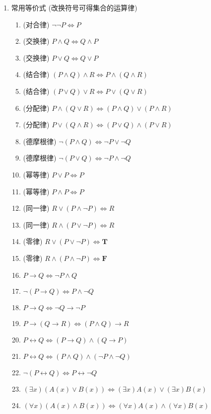 \begin{enumerate}
\item 常用等价式 (改换符号可得集合的运算律)
\begin{enumerate}[label={$E_{\arabic*}$}]
\item (对合律) $\neg\neg P \Leftrightarrow P$
\item (交换律) $P\wedge Q \Leftrightarrow Q\wedge P$
\item (交换律) $P\vee Q \Leftrightarrow Q\vee P$
\item (结合律) $(P\wedge Q)\wedge R \Leftrightarrow P\wedge(Q\wedge R)$
\item (结合律) $(P\vee Q)\vee R \Leftrightarrow P\vee(Q\vee R)$
\item (分配律) $P\wedge(Q\vee R) \Leftrightarrow (P\wedge Q)\vee(P\wedge R)$
\item (分配律) $P\vee(Q\wedge R) \Leftrightarrow (P\vee Q)\wedge(P\vee R)$
\item (德摩根律) $\neg(P\wedge Q) \Leftrightarrow \neg P\vee \neg Q$
\item (德摩根律) $\neg(P\vee Q) \Leftrightarrow \neg P\wedge \neg Q$
\item (幂等律) $P\vee P \Leftrightarrow P$
\item (幂等律) $P\wedge P \Leftrightarrow P$
\item (同一律) $R\vee(P\wedge \neg P) \Leftrightarrow R$
\item (同一律) $R\wedge(P\vee \neg P) \Leftrightarrow R$
\item (零律) $R\vee(P\vee \neg P) \Leftrightarrow \bm T$
\item (零律) $R\wedge(P\wedge \neg P) \Leftrightarrow \bm F$
\item $P\to Q \Leftrightarrow \neg P\wedge Q$
\item $\neg(P\to Q) \Leftrightarrow P\wedge\neg Q$
\item $P\to Q \Leftrightarrow \neg Q\to\neg P$
\item $P\to (Q\to R) \Leftrightarrow (P\wedge Q)\to R$
\item $P\leftrightarrow Q \Leftrightarrow (P\to Q)\wedge(Q\to P)$
\item $P\leftrightarrow Q \Leftrightarrow (P\wedge Q)\wedge(\neg P\wedge \neg Q)$
\item $\neg(P\leftrightarrow Q) \Leftrightarrow P\leftrightarrow\neg Q$
\item $(\exists x)(A(x)\vee B(x)) \Leftrightarrow (\exists x)A(x)\vee(\exists x)B(x)$
\item $(\forall x)(A(x)\wedge B(x)) \Leftrightarrow (\forall x)A(x)\wedge(\forall x)B(x)$

\end{enumerate}
\end{enumerate}
